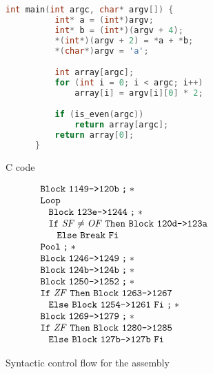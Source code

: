 \begin{figure}
  \begin{subfigure}[b]{.53\linewidth}
    \begin{lstlisting}[language=C, gobble=6]
      int main(int argc, char* argv[]) {
          int* a = (int*)argv;
          int* b = (int*)(argv + 4);
          *(int*)(argv + 2) = *a + *b;
          *(char*)argv = 'a';

          int array[argc];
          for (int i = 0; i < argc; i++)
              array[i] = argv[i][0] * 2;

          if (is_even(argc))
              return array[argc];
          return array[0];
      }
    \end{lstlisting}
    \caption{C code}\label{fig:example2-c}
  \end{subfigure}
  \hfill
  \begin{subfigure}[b]{.46\linewidth}
    \begin{equation*}
      \begin{array}{l}
        \ABB~\Block{1149}{120b}\ASeq* \\
        \AWhile \\
        \ind{2ex}\ABB~\Block{123e}{1244}\ASeq* \\
        \ind{2ex}\AIf~\var{SF}\neq\var{OF}~\AThen~\ABB~\Block{120d}{123a} \\
        \ind{4ex}\AElse~\ABreak~\AFi \\
        \AOd\ASeq* \\
        \ABB~\Block{1246}{1249}\ASeq* \\
        \ABB~\Block{124b}{124b}\ASeq* \\
        \ABB~\Block{1250}{1252}\ASeq* \\
        \AIf~\var{ZF}~\AThen~\ABB~\Block{1263}{1267} \\
        \ind{2ex}\AElse~\ABB~\Block{1254}{1261}~\AFi\ASeq* \\
        \ABB~\Block{1269}{1279}\ASeq* \\
        \AIf~\var{ZF}~\AThen~\ABB~\Block{1280}{1285} \\
        \ind{2ex}\AElse~\ABB~\Block{127b}{127b}~\AFi
      \end{array}
    \end{equation*}
    \caption{Syntactic control flow for the assembly}\label{fig:example2-scf}
  \end{subfigure}
  \begin{subfigure}{\linewidth}
    \begin{align*}

\end{align*}
\end{subfigure}
\end{figure}
